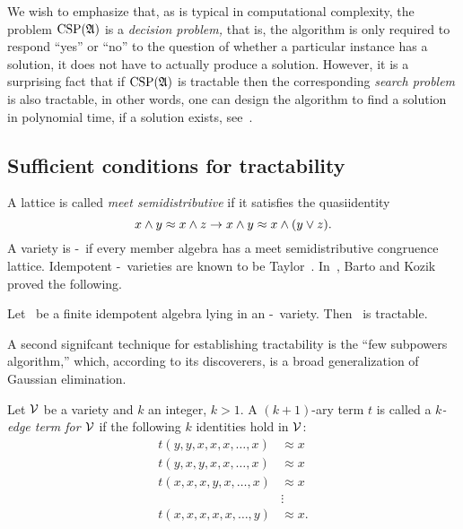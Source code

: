 We wish to emphasize that, as is typical in computational complexity, the problem $\operatorname{CSP}(\mathfrak A)$ is a \emph{decision problem,} that is, the algorithm is only required to respond ``yes'' or ``no'' to the question of whether a particular instance has a solution, it does not have to actually produce a solution. However, it is a surprising fact that if $\operatorname{CSP}(\mathfrak A)$ is tractable then the corresponding \emph{search problem} is also tractable, in other words, one can design the algorithm to find a solution in polynomial time, if a solution exists, 
see~\cite[Cor~4.9]{MR2137072}.





\subsection{Sufficient conditions for tractability}
\label{ssec:edge-sdm}
A lattice is called \emph{meet semidistributive} if it satisfies the quasiidentity
\begin{equation*}
x\wedge y \approx x\wedge z \rightarrow x\wedge y \approx x\wedge (y\vee z).
\end{equation*}
A variety is \sd-\meet\ if every member algebra has a meet semidistributive congruence lattice. Idempotent \sd-\meet\ varieties are known to be Taylor~\cite{HM:1988}. In~\cite{MR2893395}, Barto and Kozik proved the following.

\begin{theorem}\label{thm:sdm-tractable}
Let \bA\ be a finite idempotent algebra lying in an \sd-\meet\ variety. Then \bA\ is tractable. 
\end{theorem}

A second signifcant technique for establishing tractability is the ``few subpowers algorithm,'' which, according to its discoverers, is a broad generalization of Gaussian elimination.

\begin{definition}\label{defn:edge-term}
Let $\mathcal{V}$ be a variety and $k$ an integer, $k>1$. A $(k+1)$-ary term $t$ is called a \emph{$k$-edge term for $\mathcal{V}$} if the following $k$ identities hold in $\mathcal{V}$:
\begin{align*}
t(y,y,x,x,x,\dots,x) &\approx x\\
t(y,x,y,x,x,\dots,x) &\approx x\\
t(x,x,x,y,x,\dots,x) &\approx x\\
&\vdots\\
t(x,x,x,x,x,\dots,y) &\approx x.
\end{align*}
\end{definition}

